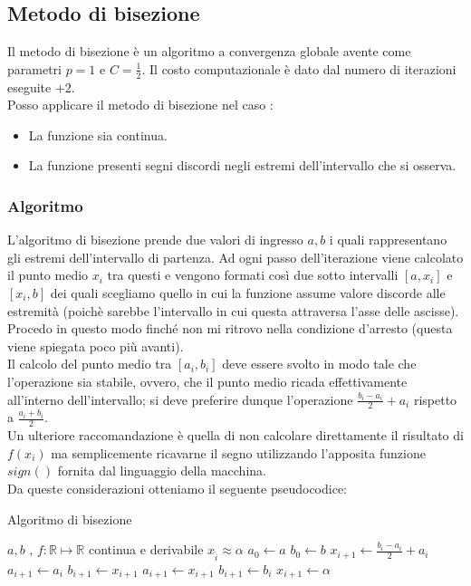 \documentclass[12pt, a4paper]{book}
\theoremstyle{definition}
\begin{document}
\subsection{Metodo di bisezione}
\begin{flushleft}
Il metodo di bisezione è un algoritmo a convergenza globale avente come parametri $p=1$ e $C=\frac{1}{2}$. Il costo computazionale è dato dal numero di iterazioni eseguite $+ 2$. \\
\vspace{1em}
Posso applicare il metodo di bisezione nel caso : 
\begin{itemize}
	\item La funzione sia continua.
	\item La funzione presenti segni discordi negli estremi dell'intervallo che si osserva.
\end{itemize}

\subsubsection{Algoritmo}
L'algoritmo di bisezione prende due valori di ingresso $a,b$ i quali rappresentano gli estremi dell'intervallo di partenza. Ad ogni passo dell'iterazione viene calcolato il punto medio $x_{i}$ tra questi e vengono formati così due sotto intervalli $[a,x_{i}]$ e $[x_{i}, b]$ dei quali scegliamo quello in cui la funzione assume valore discorde alle estremità (poichè sarebbe l'intervallo in cui questa attraversa l'asse delle ascisse). Procedo in questo modo finché non mi ritrovo nella condizione d'arresto (questa viene spiegata poco più avanti). \\
\vspace{1em}
Il calcolo del punto medio tra $[a_{i},b_{i}]$ deve essere svolto in modo tale che l'operazione sia stabile, ovvero, che il punto medio ricada effettivamente all'interno dell'intervallo; si deve preferire dunque l'operazione $\frac{b_{i} - a_{i}}{2} + a_{i}$ rispetto a $\frac{a_{i}  + b_{i}}{2}$.\\
Un ulteriore raccomandazione è quella di non calcolare direttamente il risultato di $f(x_{i})$ ma semplicemente ricavarne il segno utilizzando l'apposita funzione $sign()$ fornita dal linguaggio della macchina.\\
\pagebreak
Da queste considerazioni otteniamo il seguente pseudocodice:
\begin{algorithm}
\caption{Algoritmo di bisezione}
	\begin{algorithmic} 
		\REQUIRE $a, b$ , $f : \mathbb{R} \mapsto \mathbb{R}$ continua e derivabile
		\ENSURE $x_{\hat{i}} \approx \alpha$
		\STATE $ a_{0} \leftarrow  a$
		\STATE $ b_{0} \leftarrow  b$
			\STATE $ x_{i+1} \leftarrow  \frac{b_{i} - a_{i}}{2} + a_{i}$
				\STATE $ a_{i+1} \leftarrow  a_{i}$
				\STATE $ b_{i+1} \leftarrow  x_{i+1}$
			\ENDIF
				\STATE $ a_{i+1} \leftarrow  x_{i+1}$
				\STATE $ b_{i+1} \leftarrow  b_{i}$
			\ENDIF
				\STATE $ x_{i+1} \leftarrow  \alpha$
			\ENDIF
		\ENDWHILE
	\end{algorithmic}
\end{algorithm}


\end{flushleft}
\end{document}

